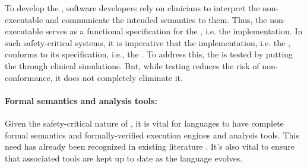 To develop the \CIG{}, software developers rely on clinicians to interpret the
non-executable \BPG{} and communicate
the intended semantics to them. Thus, the non-executable \BPG{} serves as a functional specification for
the \CIG{}, i.e. the implementation. In such safety-critical systems, it is
imperative that the implementation, i.e. the \CIG{}, conforms to its
specification, i.e., the \BPG{}. To address this, the \CIG{} is tested by
putting the \CDSS{} through clinical simulations. But, while testing reduces
the risk of non-conformance, it does not completely eliminate it.

%


\paragraph{Formal semantics and analysis tools:}

Given the safety-critical nature of \CDSSs{}, it is vital for \CIG{} languages
to have complete formal semantics and formally-verified execution engines and
analysis tools. This need has already been recognized in existing literature
\cite{SuttonAMIA03, ShaharAMIA96}. It's also vital to ensure that
associated tools are kept up to date as the language evolves.

